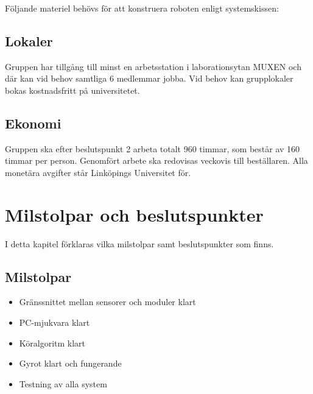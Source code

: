 \documentclass[a4paper,11pt]{article}
\begin{document}
    Följande materiel behövs för att konstruera roboten enligt systemskissen:
    
    \subsection{Lokaler}
    Gruppen har tillgång till minst en arbetsstation i laborationsytan MUXEN och där kan vid behov samtliga 6 medlemmar jobba. Vid behov kan grupplokaler bokas kostnadsfritt på universitetet.
    
    \subsection{Ekonomi}
    Gruppen ska efter beslutspunkt 2 arbeta totalt 960 timmar, som består av 160 timmar per person. Genomfört arbete ska redovisas veckovis till beställaren. Alla monetära avgifter står Linköpings Universitet för.
    
    \section{Milstolpar och beslutspunkter}
    I detta kapitel förklaras vilka milstolpar samt beslutspunkter som finns.
    
    \subsection{Milstolpar}
    \begin{itemize}
        \item Gränssnittet mellan sensorer och moduler klart
        \item PC-mjukvara klart
        \item Köralgoritm klart
        \item Gyrot klart och fungerande
        \item Testning av alla system
    \end{itemize}
    
\end{document}
